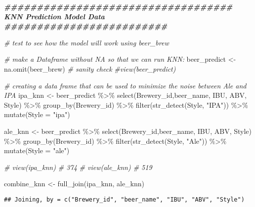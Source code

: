 \documentclass[
]{article}
\newenvironment{Shaded}{\begin{snugshade}}{\end{snugshade}}
\newcommand{\AttributeTok}[1]{\textcolor[rgb]{0.77,0.63,0.00}{#1}}
\newcommand{\CommentTok}[1]{\textcolor[rgb]{0.56,0.35,0.01}{\textit{#1}}}
\newcommand{\DocumentationTok}[1]{\textcolor[rgb]{0.56,0.35,0.01}{\textbf{\textit{#1}}}}
\newcommand{\FunctionTok}[1]{\textcolor[rgb]{0.00,0.00,0.00}{#1}}
\newcommand{\NormalTok}[1]{#1}
\newcommand{\OtherTok}[1]{\textcolor[rgb]{0.56,0.35,0.01}{#1}}
\newcommand{\SpecialCharTok}[1]{\textcolor[rgb]{0.00,0.00,0.00}{#1}}
\newcommand{\StringTok}[1]{\textcolor[rgb]{0.31,0.60,0.02}{#1}}
\begin{document}
\begin{Shaded}
\begin{Highlighting}[]
\DocumentationTok{\#\#\#\#\#\#\#\#\#\#\#\#\#\#\#\#\#\#\#\#\#\#\#\#\#\#\#\#\#\#\#\#\#\#\# KNN Prediction Model Data \#\#\#\#\#\#\#\#\#\#\#\#\#\#\#\#\#\#\#\#\#\#\#\#\#}

\CommentTok{\# test to see how the model will work using beer\_brew}

\CommentTok{\# make a Dataframe without NA so that we can run KNN:}
\NormalTok{beer\_predict }\OtherTok{\textless{}{-}} \FunctionTok{na.omit}\NormalTok{(beer\_brew)}
\CommentTok{\# sanity check }
\CommentTok{\#view(beer\_predict)}

\CommentTok{\# creating a data frame that can be used to minimize the noise between Ale and IPA}
\NormalTok{ipa\_knn }\OtherTok{\textless{}{-}}\NormalTok{ beer\_predict }\SpecialCharTok{\%\textgreater{}\%} \FunctionTok{select}\NormalTok{(Brewery\_id,beer\_name, IBU, ABV, Style) }\SpecialCharTok{\%\textgreater{}\%}
  \FunctionTok{group\_by}\NormalTok{(Brewery\_id) }\SpecialCharTok{\%\textgreater{}\%} \FunctionTok{filter}\NormalTok{(}\FunctionTok{str\_detect}\NormalTok{(Style, }\StringTok{"IPA"}\NormalTok{)) }\SpecialCharTok{\%\textgreater{}\%}
  \FunctionTok{mutate}\NormalTok{(}\AttributeTok{Style =} \StringTok{"ipa"}\NormalTok{)}

\NormalTok{ale\_knn }\OtherTok{\textless{}{-}}\NormalTok{ beer\_predict }\SpecialCharTok{\%\textgreater{}\%} \FunctionTok{select}\NormalTok{(Brewery\_id,beer\_name, IBU, ABV, Style) }\SpecialCharTok{\%\textgreater{}\%}
  \FunctionTok{group\_by}\NormalTok{(Brewery\_id) }\SpecialCharTok{\%\textgreater{}\%} \FunctionTok{filter}\NormalTok{(}\FunctionTok{str\_detect}\NormalTok{(Style, }\StringTok{"Ale"}\NormalTok{)) }\SpecialCharTok{\%\textgreater{}\%} 
  \FunctionTok{mutate}\NormalTok{(}\AttributeTok{Style =} \StringTok{"ale"}\NormalTok{)}

\CommentTok{\# view(ipa\_knn)  \# 374}
\CommentTok{\# view(ale\_knn) \# 519}

\NormalTok{combine\_knn }\OtherTok{\textless{}{-}} \FunctionTok{full\_join}\NormalTok{(ipa\_knn, ale\_knn)}
\end{Highlighting}
\end{Shaded}

\begin{verbatim}
## Joining, by = c("Brewery_id", "beer_name", "IBU", "ABV", "Style")
\end{verbatim}
\end{document}
